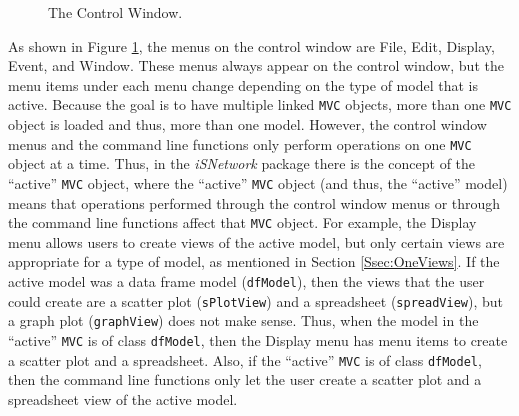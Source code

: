 \documentclass{article}[11pt]
\newcommand{\Robject}[1]{{\texttt{#1}}}
\newcommand{\Rpackage}[1]{{\textit{#1}}}
\newcommand{\Rclass}[1]{\texttt{#1}}
\begin{document}
\begin{figure}[ht]
  \begin{center}
    \caption{ The Control Window. }
    \label{Fig:ContWin}
  \end{center}
\end{figure}

As shown in Figure \ref{Fig:ContWin}, the menus on the control window are
File, Edit, Display, Event, and Window.  These menus always appear on the
control window, but the menu items under each menu change depending on
the type of model that is active.  Because the goal is to have multiple
linked \Robject{MVC} objects, more than one \Robject{MVC} object is loaded and
thus, more than one model. However, the control window menus and the command
line functions only perform operations on one \Robject{MVC} object at a time.
Thus, in the \Rpackage{iSNetwork} package there is the concept of the
``active'' \Robject{MVC} object, where the ``active'' \Robject{MVC} object
(and thus, the ``active'' model) means that operations performed through the
control window menus or through the command line functions affect that
\Robject{MVC} object.  For example, the Display menu allows users to create
views of the active model, but only certain views are appropriate for a type
of model, as mentioned in 
Section \ref{Ssec:OneViews}.  If the active model was a data frame model
(\Rclass{dfModel}), then the views that the user could create are a
scatter plot (\Rclass{sPlotView}) and a spreadsheet (\Rclass{spreadView}),
but a graph plot (\Rclass{graphView}) does not make sense.  Thus, when the
model in the ``active'' \Robject{MVC} is of class \Rclass{dfModel}, then the
Display 
menu has menu items to create a scatter plot and a spreadsheet.  Also, if
the ``active'' \Robject{MVC} is of class \Rclass{dfModel}, then the command
line functions only let the user create a scatter plot and a spreadsheet view
of the active model.
\end{document}
